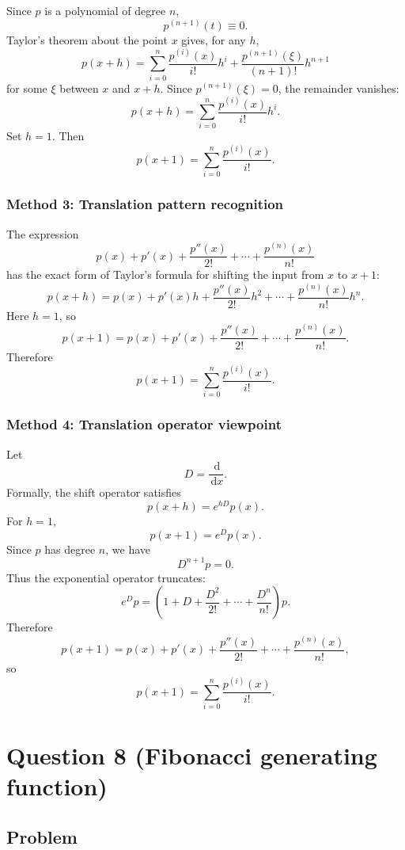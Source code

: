 \documentclass[12pt]{article}
\newcommand{\dd}{\,\mathrm{d}}
\begin{document}
Since \(p\) is a polynomial of degree \(n\),
\[
p^{(n+1)}(t)\equiv 0.
\]
Taylor's theorem about the point \(x\) gives, for any \(h\),
\[
p(x+h)=
\sum_{i=0}^{n}\frac{p^{(i)}(x)}{i!}h^i
+
\frac{p^{(n+1)}(\xi)}{(n+1)!}h^{n+1}
\]
for some \(\xi\) between \(x\) and \(x+h\). Since \(p^{(n+1)}(\xi)=0\), the remainder vanishes:
\[
p(x+h)=
\sum_{i=0}^{n}\frac{p^{(i)}(x)}{i!}h^i.
\]
Set \(h=1\). Then
\[
\boxed{
p(x+1)=\sum_{i=0}^{n}\frac{p^{(i)}(x)}{i!}.
}
\]

\newpage
\subsubsection{Method 3: Translation pattern recognition}

The expression
\[
p(x)+p'(x)+\frac{p''(x)}{2!}+\cdots+\frac{p^{(n)}(x)}{n!}
\]
has the exact form of Taylor's formula for shifting the input from \(x\) to \(x+1\):
\[
p(x+h)=
p(x)+p'(x)h+\frac{p''(x)}{2!}h^2+\cdots+\frac{p^{(n)}(x)}{n!}h^n.
\]
Here \(h=1\), so
\[
p(x+1)
=
p(x)+p'(x)+\frac{p''(x)}{2!}+\cdots+\frac{p^{(n)}(x)}{n!}.
\]
Therefore
\[
\boxed{
p(x+1)=\sum_{i=0}^{n}\frac{p^{(i)}(x)}{i!}.
}
\]


\bigskip
\subsubsection{Method 4: Translation operator viewpoint}

Let
\[
D=\frac{\dd}{\dd x}.
\]
Formally, the shift operator satisfies
\[
p(x+h)=e^{hD}p(x).
\]
For \(h=1\),
\[
p(x+1)=e^D p(x).
\]
Since \(p\) has degree \(n\), we have
\[
D^{n+1}p=0.
\]
Thus the exponential operator truncates:
\[
e^D p
=
\left(
1+D+\frac{D^2}{2!}+\cdots+\frac{D^n}{n!}
\right)p.
\]
Therefore
\[
p(x+1)
=
p(x)+p'(x)+\frac{p''(x)}{2!}+\cdots+\frac{p^{(n)}(x)}{n!},
\]
so
\[
\boxed{
p(x+1)=\sum_{i=0}^{n}\frac{p^{(i)}(x)}{i!}.
}
\]


\newpage
\section{Question 8 (Fibonacci generating function)}

\subsection{Problem}
\end{document}
